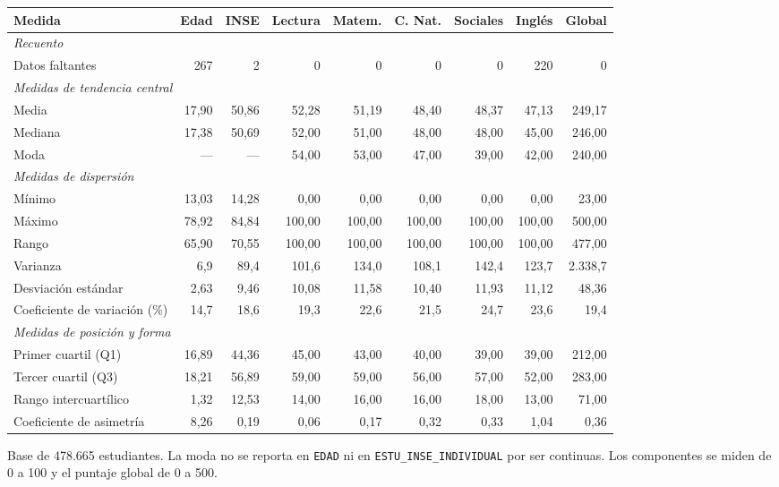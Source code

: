 \begingroup\tiny{}\setlength{\tabcolsep}{4pt}
\par
\noindent\begin{minipage}{\textwidth}
\centering
{}\label{tab:resumen-cuant}
\begin{tabular}{l r r r r r r r r}
  \toprule
  \textbf{Medida} & \textbf{Edad} & \textbf{INSE} & \textbf{Lectura} & \textbf{Matem.} & \textbf{C. Nat.} & \textbf{Sociales} & \textbf{Inglés} & \textbf{Global} \\
  \midrule

  \multicolumn{9}{l}{\textit{Recuento}} \\
  Datos faltantes & 267 & 2 & 0 & 0 & 0 & 0 & 220 & 0 \\
  \multicolumn{9}{l}{\textit{Medidas de tendencia central}} \\
  Media & 17,90 & 50,86 & 52,28 & 51,19 & 48,40 & 48,37 & 47,13 & 249,17 \\
  Mediana & 17,38 & 50,69 & 52,00 & 51,00 & 48,00 & 48,00 & 45,00 & 246,00 \\
  Moda & --- & --- & 54,00 & 53,00 & 47,00 & 39,00 & 42,00 & 240,00 \\
  \multicolumn{9}{l}{\textit{Medidas de dispersión}} \\
  Mínimo & 13,03 & 14,28 & 0,00 & 0,00 & 0,00 & 0,00 & 0,00 & 23,00 \\
  Máximo & 78,92 & 84,84 & 100,00 & 100,00 & 100,00 & 100,00 & 100,00 & 500,00 \\
  Rango & 65,90 & 70,55 & 100,00 & 100,00 & 100,00 & 100,00 & 100,00 & 477,00 \\
  Varianza & 6,9 & 89,4 & 101,6 & 134,0 & 108,1 & 142,4 & 123,7 & 2.338,7 \\
  Desviación estándar & 2,63 & 9,46 & 10,08 & 11,58 & 10,40 & 11,93 & 11,12 & 48,36 \\
  Coeficiente de variación (\%) & 14,7 & 18,6 & 19,3 & 22,6 & 21,5 & 24,7 & 23,6 & 19,4 \\
  \multicolumn{9}{l}{\textit{Medidas de posición y forma}} \\
  Primer cuartil (Q1) & 16,89 & 44,36 & 45,00 & 43,00 & 40,00 & 39,00 & 39,00 & 212,00 \\
  Tercer cuartil (Q3) & 18,21 & 56,89 & 59,00 & 59,00 & 56,00 & 57,00 & 52,00 & 283,00 \\
  Rango intercuartílico & 1,32 & 12,53 & 14,00 & 16,00 & 16,00 & 18,00 & 13,00 & 71,00 \\
  Coeficiente de asimetría & 8,26 & 0,19 & 0,06 & 0,17 & 0,32 & 0,33 & 1,04 & 0,36 \\
  \bottomrule
\end{tabular}
\par\raggedright{\footnotesize Base de 478.665 estudiantes. La moda no se reporta en \texttt{EDAD} ni en \texttt{ESTU\_INSE\_INDIVIDUAL} por ser continuas. Los componentes se miden de 0 a 100 y el puntaje global de 0 a 500.\par}
\end{minipage}
\par
\endgroup
